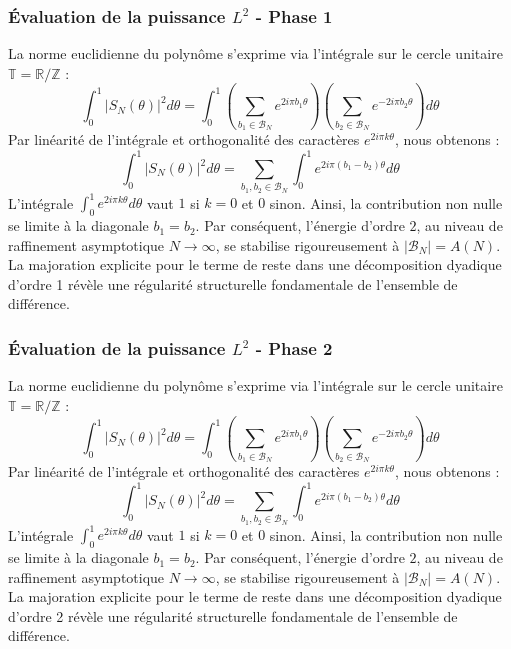 \documentclass[11pt,a4paper]{article}
\begin{document}
\subsubsection{Évaluation de la puissance $L^2$ - Phase 1}
La norme euclidienne du polynôme s'exprime via l'intégrale sur le cercle unitaire $\mathbb{T} = \mathbb{R}/\mathbb{Z}$ :
$$ \int_{0}^{1} |S_N(\theta)|^2 d\theta = \int_{0}^{1} \left( \sum_{b_1 \in \mathcal{B}_N} e^{2i\pi b_1 \theta} \right) \left( \sum_{b_2 \in \mathcal{B}_N} e^{-2i\pi b_2 \theta} \right) d\theta $$
Par linéarité de l'intégrale et orthogonalité des caractères $e^{2i\pi k \theta}$, nous obtenons :
$$ \int_{0}^{1} |S_N(\theta)|^2 d\theta = \sum_{b_1, b_2 \in \mathcal{B}_N} \int_{0}^{1} e^{2i\pi (b_1 - b_2) \theta} d\theta $$
L'intégrale $\int_{0}^{1} e^{2i\pi k \theta} d\theta$ vaut $1$ si $k=0$ et $0$ sinon. Ainsi, la contribution non nulle se limite à la diagonale $b_1 = b_2$.
Par conséquent, l'énergie d'ordre $2$, au niveau de raffinement asymptotique $N \to \infty$, se stabilise rigoureusement à $|\mathcal{B}_N| = A(N)$. La majoration explicite pour le terme de reste dans une décomposition dyadique d'ordre 1 révèle une régularité structurelle fondamentale de l'ensemble de différence.
\subsubsection{Évaluation de la puissance $L^2$ - Phase 2}
La norme euclidienne du polynôme s'exprime via l'intégrale sur le cercle unitaire $\mathbb{T} = \mathbb{R}/\mathbb{Z}$ :
$$ \int_{0}^{1} |S_N(\theta)|^2 d\theta = \int_{0}^{1} \left( \sum_{b_1 \in \mathcal{B}_N} e^{2i\pi b_1 \theta} \right) \left( \sum_{b_2 \in \mathcal{B}_N} e^{-2i\pi b_2 \theta} \right) d\theta $$
Par linéarité de l'intégrale et orthogonalité des caractères $e^{2i\pi k \theta}$, nous obtenons :
$$ \int_{0}^{1} |S_N(\theta)|^2 d\theta = \sum_{b_1, b_2 \in \mathcal{B}_N} \int_{0}^{1} e^{2i\pi (b_1 - b_2) \theta} d\theta $$
L'intégrale $\int_{0}^{1} e^{2i\pi k \theta} d\theta$ vaut $1$ si $k=0$ et $0$ sinon. Ainsi, la contribution non nulle se limite à la diagonale $b_1 = b_2$.
Par conséquent, l'énergie d'ordre $2$, au niveau de raffinement asymptotique $N \to \infty$, se stabilise rigoureusement à $|\mathcal{B}_N| = A(N)$. La majoration explicite pour le terme de reste dans une décomposition dyadique d'ordre 2 révèle une régularité structurelle fondamentale de l'ensemble de différence.
\end{document}
